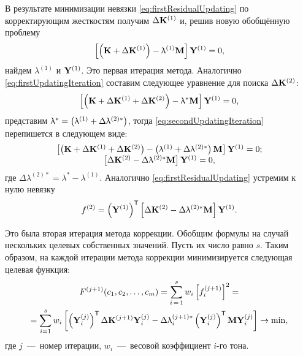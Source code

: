 В результате минимизации невязки \eqref{eq:firstResidualUpdating} по корректирующим жесткостям получим $ \Delta \mathbf{K} ^ {(1)} $ и, решив новую обобщённую проблему
\begin{equation}
	\left[ \left( \mathbf{K} + \Delta \mathbf{K} ^ {(1)} \right) - \uplambda ^ {(1)} \mathbf{M} \right] \mathbf{Y} ^ {(1)} = 0,
\end{equation}
найдем $ \lambda ^ {(1)} $ и $ \mathbf{Y} ^ {(1)} $. Это первая итерация метода. Аналогично \eqref{eq:firstUpdatingIteration} составим следующее уравнение для поиска $ \Delta \mathbf{K} ^ {(2)} $:
\begin{equation}
	\left[ \left( \mathbf{K} + \Delta \mathbf{K} ^ {(1)} + \Delta \mathbf{K} ^ {(2)} \right) - \uplambda ^ \ast \mathbf{M} \right] \mathbf{Y} ^ {(1)} = 0,
	\label{eq:secondUpdatingIteration}
\end{equation}
представим $ \uplambda ^ \ast = \left( \uplambda ^ {(1)} + \Delta \uplambda ^ {(2) \ast} \right) $, тогда \eqref{eq:secondUpdatingIteration} перепишется в следующем виде:
\begin{equation}
	\begin{matrix}
		\left[ \left( \mathbf{K} + \Delta \mathbf{K} ^ {(1)} + \Delta \mathbf{K} ^ {(2)} \right) - \left( \uplambda ^ {(1)} + \Delta \uplambda ^ {(2) \ast} \right) \mathbf{M} \right] \mathbf{Y} ^ {(1)} = 0; \\
		\left[ \Delta \mathbf{K} ^ {(2)} - \Delta \uplambda ^ {(2) \ast} \mathbf{M} \right] \mathbf{Y} ^ {(1)} = 0,
	\end{matrix}
\end{equation}
где $ \Delta \lambda ^ {(2) \ast} = \lambda ^ \ast - \lambda ^ {(1)} $. Аналогично \eqref{eq:firstResidualUpdating} устремим к нулю невязку
\begin{equation}
	f ^ {(2)} = \left( \mathbf{Y} ^ {(1)} \right) ^ \mathsf{T} \left[ \Delta \mathbf{K} ^ {(2)} - \Delta \uplambda ^ {(2) \ast} \mathbf{M} \right] \mathbf{Y} ^ {(1)}.
\end{equation}

Это была вторая итерация метода коррекции. Обобщим формулы на случай нескольких целевых собственных значений. Пусть их число равно $ s $. Таким образом, на каждой итерации метода коррекции минимизируется следующая целевая функция:
\begin{gather}
	F ^ {(j + 1)}(c_1, c_2, \hdots, c_m) = \sum\limits_{i\,=\,1}^s w_i \left[ f_i ^ {(j + 1)} \right] ^ 2 = \nonumber \\
	= \sum\limits_{i = 1} ^ s w_i \left[ \left( \mathbf{Y}_i ^ {(j)} \right) ^ \mathsf{T} \Delta \mathbf{K} ^ {(j + 1)} \mathbf{Y}_i ^ {(j)} - \Delta \uplambda_i ^ {(j + 1) \ast} \left( \mathbf{Y}_i ^ {(j)} \right) ^ \mathsf{T} \mathbf{M} \mathbf{Y}_i ^ {(j)} \right] \rightarrow \min,
	\label{eq:objFunUpdating}
\end{gather}
где $ j $~---~номер итерации, $ w_i $~---~весовой коэффициент $ i $-го тона.

